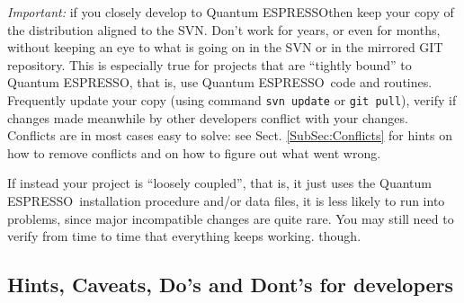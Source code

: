 \documentclass[12pt,a4paper]{article}
\def\qe{{\sc Quantum ESPRESSO}}
\begin{document}

{\em Important:} if you closely develop to \qe then keep your copy of the 
distribution aligned to the SVN. Don't work for years, or even for months, 
without keeping an eye to what is going on in the SVN or in the mirrored GIT 
repository. This is especially true for projects that are ``tightly bound'' 
to \qe, that is, use \qe\ code and routines. Frequently update your copy 
(using command \texttt{svn update} or \texttt{git pull}), verify if changes 
made meanwhile by other developers conflict with your changes.
Conflicts are in most cases easy to solve: see Sect. \ref{SubSec:Conflicts} 
for hints on how to remove conflicts and on how to figure out what went wrong.

If instead your project is ``loosely coupled'', that is, it just uses the
\qe\ installation procedure and/or data files, it is less likely to run
into problems, since major incompatible changes are quite rare.
You may still need to verify from time to time that everything keeps
working. though.

\subsection{Hints, Caveats, Do's and Dont's for developers}
\end{document}
